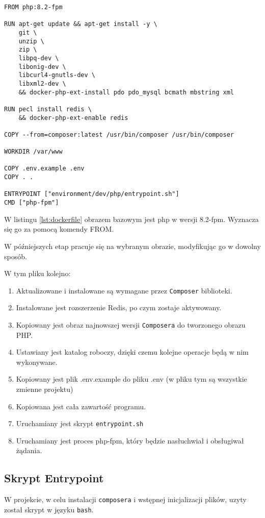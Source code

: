 \newpage
\begin{lstlisting}[style=dockerfile, caption={Konfiguracja obrazu php w pliku Dockerilfe}, label={lst:dockerfile}]
FROM php:8.2-fpm

RUN apt-get update && apt-get install -y \
    git \
    unzip \
    zip \
    libpq-dev \
    libonig-dev \
    libcurl4-gnutls-dev \
    libxml2-dev \
    && docker-php-ext-install pdo pdo_mysql bcmath mbstring xml

RUN pecl install redis \
    && docker-php-ext-enable redis

COPY --from=composer:latest /usr/bin/composer /usr/bin/composer

WORKDIR /var/www

COPY .env.example .env
COPY . .

ENTRYPOINT ["environment/dev/php/entrypoint.sh"]
CMD ["php-fpm"]
\end{lstlisting}

W listingu \ref{lst:dockerfile} obrazem bazowym jest php w wersji 8.2-fpm. Wyznacza się go za pomocą komendy FROM.

W późniejszych etap pracuje się na wybranym obrazie, modyfikując go w dowolny sposób.

W tym pliku kolejno:
\begin{enumerate}
    \item Aktualizowane i instalowane są wymagane przez \verb|Composer| biblioteki.
    \item Instalowane jest rozszerzenie Redis, po czym zostaje aktywowany.
    \item Kopiowany jest obraz najnowszej wersji \verb|Composera| do tworzonego obrazu PHP.
    \item Ustawiany jest katalog roboczy, dzięki czemu kolejne operacje będą w nim wykonywane.
    \item Kopiowany jest plik .env.example do pliku .env (w pliku tym są wszystkie zmienne projektu)
    \item Kopiowana jest cała zawartość programu.
    \item Uruchamiany jest skrypt \verb|entrypoint.sh|
    \item Uruchamiany jest proces php-fpm, który będzie nasłuchwiał i obsługiwał żądania.
\end{enumerate}

\subsection{Skrypt Entrypoint}
W projekcie, w celu instalacji \verb|composera| i wstępnej inicjalizacji plików, uzyty został skrypt w języku \verb|bash|.

